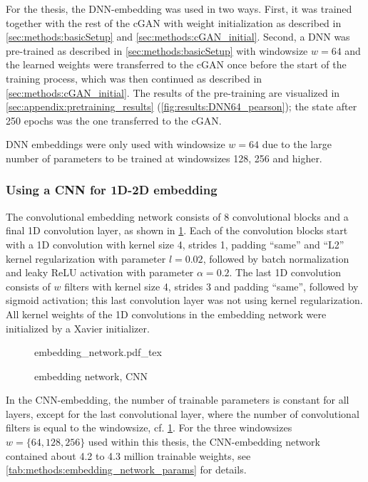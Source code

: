 For the thesis, the DNN-embedding was used in two ways.
First, it was trained together with the rest of the cGAN with weight initialization as described in 
\cref{sec:methods:basicSetup} and \ref{sec:methods:cGAN_initial}.
Second, a DNN was pre-trained as described in \cref{sec:methods:basicSetup} with windowsize $w=64$
and the learned weights were transferred to the cGAN once before the start of the training process,
which was then continued as described in \cref{sec:methods:cGAN_initial}.
The results of the pre-training are visualized in \cref{sec:appendix:pretraining_results} (\cref{fig:results:DNN64_pearson});
the state after 250 epochs was the one transferred to the cGAN.

DNN embeddings were only used with windowsize $w=64$ due to the large number of parameters
to be trained at windowsizes 128, 256 and higher.

\subsubsection{Using a CNN for 1D-2D embedding} \label{sec:methods:cnn-embedding}
The convolutional embedding network consists of 8 convolutional blocks and a final 1D convolution layer, 
as shown in \cref{fig:methods:GAN_arch:embedding_network}.
Each of the convolution blocks start with a 1D convolution with kernel size 4, strides 1, padding ``same'' 
and ``L2'' kernel regularization with parameter $l=0.02$, followed by batch normalization and leaky ReLU activation
with parameter $\alpha=0.2$. 
The last 1D convolution consists of $w$ filters with kernel size 4, strides 3 and padding ``same'',
followed by sigmoid activation; this last convolution layer was not using kernel regularization.
All kernel weights of the 1D convolutions in the embedding network were initialized by a Xavier initializer.
\begin{figure}[p]
    \scriptsize
    \centering
    {embedding_network.pdf_tex}
    \caption{embedding network, CNN} \label{fig:methods:GAN_arch:embedding_network}
\end{figure}

In the CNN-embedding, the number of trainable parameters is constant for all layers, except for the last convolutional layer, where the number
of convolutional filters is equal to the windowsize, cf. \cref{fig:methods:GAN_arch:embedding_network}. 
For the three windowsizes $w=\{64,128,256\}$ used within this thesis, the CNN-embedding network 
contained about 4.2 to 4.3 million trainable weights, see \cref{tab:methods:embedding_network_params} for details.

